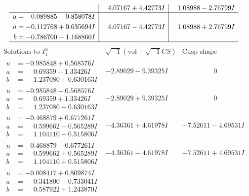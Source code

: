 \documentclass[1p]{elsarticle_modified}
\theoremstyle{definition}
\newcommand{\I}{\sqrt{-1}}
\begin{document}
$$\begin{array}{c|c|c}
 & \phantom{-}4.07167 + 4.42773 I & \phantom{-}1.08988 - 2.76799 I \\ \hline\begin{aligned}
u &= -0.089885 - 0.858078 I \\
a &= -0.112768 + 0.635694 I \\
b &= -0.786700 - 1.168860 I\end{aligned}
 & \phantom{-}4.07167 - 4.42773 I & \phantom{-}1.08988 + 2.76799 I\\
 \hline 
 \end{array}$$\newpage$$\begin{array}{c|c|c}  
\text{Solutions to }I^u_{1}& \I (\text{vol} + \sqrt{-1}CS) & \text{Cusp shape}\\
 \hline 
\begin{aligned}
u &= -0.985848 + 0.568576 I \\
a &= \phantom{-}0.69359 - 1.33426 I \\
b &= \phantom{-}1.237080 + 0.630163 I\end{aligned}
 & -2.89029 - 9.39325 I & \phantom{-0.000000 } 0 \\ \hline\begin{aligned}
u &= -0.985848 - 0.568576 I \\
a &= \phantom{-}0.69359 + 1.33426 I \\
b &= \phantom{-}1.237080 - 0.630163 I\end{aligned}
 & -2.89029 + 9.39325 I & \phantom{-0.000000 } 0 \\ \hline\begin{aligned}
u &= -0.468879 + 0.677261 I \\
a &= \phantom{-}0.599662 - 0.565289 I \\
b &= \phantom{-}1.104110 - 0.515806 I\end{aligned}
 & -4.36361 + 4.61978 I & -7.52611 - 4.69531 I \\ \hline\begin{aligned}
u &= -0.468879 - 0.677261 I \\
a &= \phantom{-}0.599662 + 0.565289 I \\
b &= \phantom{-}1.104110 + 0.515806 I\end{aligned}
 & -4.36361 - 4.61978 I & -7.52611 + 4.69531 I \\ \hline\begin{aligned}
u &= -0.008417 + 0.809874 I \\
a &= \phantom{-}0.341800 - 0.733041 I \\
b &= \phantom{-}0.587922 + 1.243870 I\end{aligned}

\end{array}$$
\end{document}
